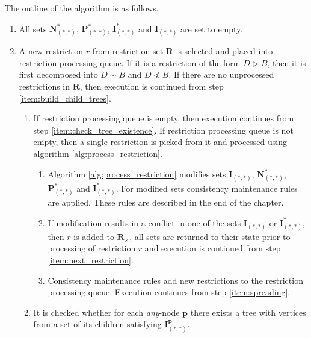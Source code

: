 \documentclass[10pt, conference]{IEEEtran}
\newcommand{\ib}[1]{\textbf{#1}}
\newcommand{\gR}{\ib{R}}
\newcommand{\gRx}{\gR_{\times}}
\newcommand{\gI}{\ib{I}}
\newcommand{\gN}{\ib{N}}
\newcommand{\gP}{\ib{P}}
\newcommand{\gp}{\ib{p}}
\newcommand{\any}{\textit{any}}
\newcommand{\nlhd}{\ntriangleleft}
\newcommand{\compact}{}
\begin{document}
The outline of the algorithm is as follows.
\begin{enumerate}\compact
\renewcommand{\theenumii}{.\arabic{enumii}}
\renewcommand{\theenumiii}{.\arabic{enumiii}}
\renewcommand{\labelenumii}{\theenumi\theenumii)}
\renewcommand{\labelenumiii}{\theenumi\theenumii\theenumiii)}
\item All sets $\gN^{*}_{(*, *)}$, $\gP^{*}_{(*, *)}$,
    $\gI^{*}_{(*, *)}$ and $\gI_{(*, *)}$ are set to empty.
\item \label{item:next_restriction}
    A new restriction $r$ from restriction set $\gR$ is selected and placed into restriction processing queue.
    If it is a restriction of the form $D \rhd B$, then it is first decomposed into
    $D \sim B$ and $D \nlhd B$. If there are no unprocessed restrictions in $\gR$, then
    execution is continued from step \ref{item:build_child_trees}.
    \begin{enumerate}\compact
    \item \label{item:spreading}
        If restriction processing queue is empty, then execution continues from step
        \ref{item:check_tree_existence}.
        If restriction processing queue is not empty, then a single restriction is picked from
        it and processed using algorithm \ref{alg:process_restriction}.
        \begin{enumerate}\compact
        \item Algorithm \ref{alg:process_restriction} modifies sets $\gI_{(*, *)}$,
            $\gN^{*}_{(*, *)}$, $\gP^{*}_{(*, *)}$ and $\gI^{*}_{(*, *)}$.
            For modified sets consistency maintenance rules are applied.
            These rules are described in the end of the chapter.
        \item If modification results in a conflict in one of the sets $\gI_{(*, *)}$ or
            $\gI^{*}_{(*, *)}$, then $r$ is added to $\gRx$, all sets are returned to their state 
            prior to processing
            of restriction $r$ and execution is continued from step \ref{item:next_restriction}.
        \item Consistency maintenance rules add new restrictions to the restriction processing
            queue. Execution continues from step \ref{item:spreading}.
        \end{enumerate}
    \item \label{item:check_tree_existence}
        It is checked whether for each \any-node $\gp$ there exists
        a tree with vertices from a set of its children satisfying $\gI^{\gp}_{(*, *)}$.

\end{enumerate}
\end{enumerate}
\end{document}
